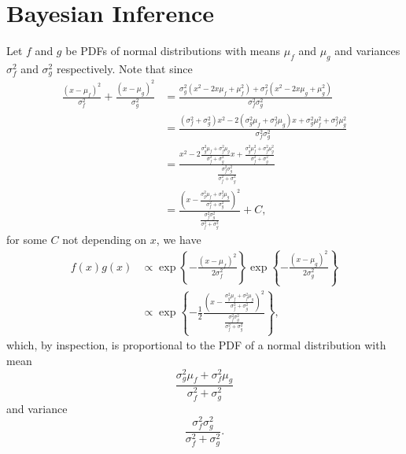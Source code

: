 \chapter{Bayesian Inference}

\begin{ex}
  Let $f$ and $g$ be PDFs of normal distributions with means $\mu_f$ and $\mu_g$
  and variances $\sigma_f^2$ and $\sigma_g^2$ respectively. Note that since
  \begin{align*}
    \frac{(x-\mu_f)^2}{\sigma_f^2}
    +\frac{(x-\mu_g)^2}{\sigma_g^2}
     & =\frac{\sigma_g^2(x^2-2x\mu_f+\mu_f^2)+\sigma_f^2(x^2-2x\mu_g+\mu_g^2)}{\sigma_f^2\sigma_g^2}                                                                                                      \\
     & =\frac{(\sigma_f^2+\sigma_g^2)x^2-2(\sigma_g^2\mu_f+\sigma_f^2\mu_g) x+\sigma_g^2\mu_f^2+\sigma_f^2\mu_g^2}{\sigma_f^2\sigma_g^2}                                                                  \\
     & =\frac{x^2-2\frac{\sigma_g^2\mu_f+\sigma_f^2\mu_g}{\sigma_f^2+\sigma_g^2} x+\frac{\sigma_g^2\mu_f^2+\sigma_f^2\mu_g^2}{\sigma_f^2+\sigma_g^2}}{\frac{\sigma_f^2\sigma_g^2}{\sigma_f^2+\sigma_g^2}} \\
     & =\frac{\left(x-\frac{\sigma_g^2\mu_f+\sigma_f^2\mu_g}{\sigma_f^2+\sigma_g^2}\right)^2}{\frac{\sigma_f^2\sigma_g^2}{\sigma_f^2+\sigma_g^2}} +C,
  \end{align*}
  for some $C$ not depending on $x$, we have
  \begin{align*}
    f(x)g(x)
     & \propto \exp\left\{-\frac{(x-\mu_f)^2}{2\sigma_f^2}\right\}
    \exp\left\{-\frac{(x-\mu_g)^2}{2\sigma_g^2}\right\}                                                                                                                                  \\
     & \propto \exp\left\{-\frac{1}{2}\frac{\left(x-\frac{\sigma_g^2\mu_f+\sigma_f^2\mu_g}{\sigma_f^2+\sigma_g^2}\right)^2}{\frac{\sigma_f^2\sigma_g^2}{\sigma_f^2+\sigma_g^2}}\right\},
  \end{align*}
  which, by inspection, is proportional to the PDF of a normal distribution with
  mean
  \[
    \frac{\sigma_g^2\mu_f+\sigma_f^2\mu_g}{\sigma_f^2+\sigma_g^2}
  \]
  and variance
  \[
    \frac{\sigma_f^2\sigma_g^2}{\sigma_f^2+\sigma_g^2}.
  \]


\end{ex}
